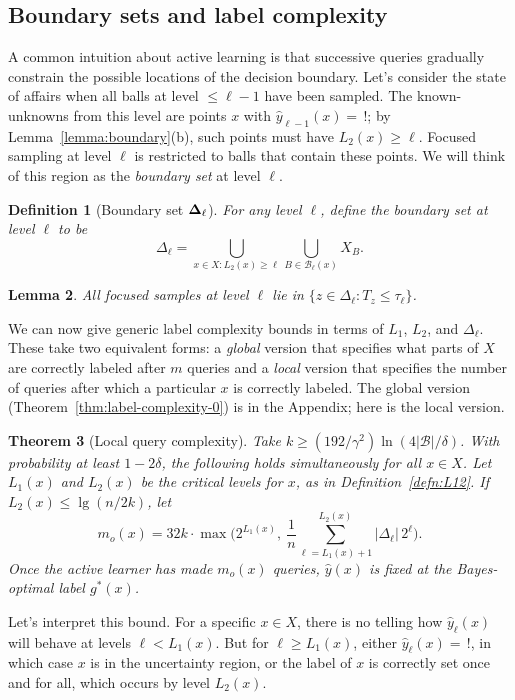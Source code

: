 \documentclass[twoside]{article}
\def\B{{\mathcal B}}
\def\yh{{\widehat{y}}}
\newtheorem{thm}{Theorem}
\newtheorem{lemma}[thm]{Lemma}
\newtheorem{defn}[thm]{Definition}
\begin{document}
\subsection{Boundary sets and label complexity}

A common intuition about active learning is that successive queries gradually constrain the possible locations of the decision boundary. Let's consider the state of affairs when all balls at level $\leq \ell - 1$ have been sampled. The known-unknowns from this level are points $x$ with $\yh_{\ell-1}(x) = \, !$; by Lemma~\ref{lemma:boundary}(b), such points must have $L_2(x) \geq \ell$. Focused sampling at level $\ell$ is restricted to balls that contain these points. We will think of this region as the \emph{boundary set} at level $\ell$.
\begin{defn}[Boundary set $\bf \Delta_\ell$]
For any level $\ell$, define the \emph{boundary set} at level $\ell$ to be
\begin{equation}
\Delta_\ell 
= \bigcup_{x \in X: L_2(x) \geq \ell} \bigcup_{B \in \B_{\ell}(x)} X_B 
.
\label{eq:sampling-region}
\end{equation}
\end{defn}
\begin{lemma}
All focused samples at level $\ell$ lie in $\{z \in \Delta_\ell: T_z \leq \tau_\ell \}$.
\label{lemma:focused}
\end{lemma}

We can now give generic label complexity bounds in terms of $L_1$, $L_2$, and $\Delta_\ell$. These take two equivalent forms: a \emph{global} version that specifies what parts of $X$ are correctly labeled after $m$ queries and a \emph{local} version that specifies the number of queries after which a particular $x$ is correctly labeled. The global version (Theorem~\ref{thm:label-complexity-0}) is in the Appendix; here is the local version.

\begin{thm}[Local query complexity]
Take $k \geq (192/\gamma^2) \ln (4 |\B|/\delta)$. With probability at least $1-2\delta$, the following holds simultaneously for all $x \in X$. Let $L_1(x)$ and $L_2(x)$ be the critical levels for $x$, as in Definition~\ref{defn:L12}. If $L_2(x) \leq \lg (n/2k)$, let
\[
m_o(x) = 32k \cdot \max\bigg( 2^{L_1(x)}, \ \frac{1}{n} \sum_{\ell=L_1(x)+1}^{L_2(x)} |\Delta_\ell| \, 2^\ell\bigg) .
\]
Once the active learner has made $m_o(x)$ queries, $\yh(x)$ is fixed at the Bayes-optimal label $g^*(x)$.
\label{thm:label-complexity}
\end{thm}
Let's interpret this bound. For a specific $x \in X$, there is no telling how $\yh_\ell(x)$ will behave at levels $\ell < L_1(x)$. But for $\ell \geq L_1(x)$, either $\yh_\ell(x) = \, !$, in which case $x$ is in the uncertainty region, or the label of $x$ is correctly set once and for all, which occurs by level $L_2(x)$. 
\end{document}
